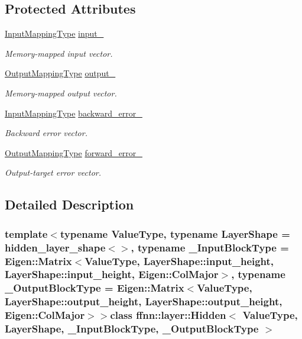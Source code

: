 \subsection*{Protected Attributes}
\begin{DoxyCompactItemize}
\item 
\hyperlink{classffnn_1_1layer_1_1_hidden_a9297d5b8ac45dc288ee1b91f15bb4047}{Input\-Mapping\-Type} \hyperlink{classffnn_1_1layer_1_1_hidden_a1177e86b75ad7ba87aa4e855defa5851}{input\-\_\-}
\begin{DoxyCompactList}\small\item\em Memory-\/mapped input vector. \end{DoxyCompactList}\item 
\hyperlink{classffnn_1_1layer_1_1_hidden_a619ae9b0890cb86b66ac2b591b5a5610}{Output\-Mapping\-Type} \hyperlink{classffnn_1_1layer_1_1_hidden_adf9818c784dccc1860fe8384264cc4be}{output\-\_\-}
\begin{DoxyCompactList}\small\item\em Memory-\/mapped output vector. \end{DoxyCompactList}\item 
\hyperlink{classffnn_1_1layer_1_1_hidden_a9297d5b8ac45dc288ee1b91f15bb4047}{Input\-Mapping\-Type} \hyperlink{classffnn_1_1layer_1_1_hidden_a94312439d5029c9c779ff778f18f95a8}{backward\-\_\-error\-\_\-}
\begin{DoxyCompactList}\small\item\em Backward error vector. \end{DoxyCompactList}\item 
\hyperlink{classffnn_1_1layer_1_1_hidden_a619ae9b0890cb86b66ac2b591b5a5610}{Output\-Mapping\-Type} \hyperlink{classffnn_1_1layer_1_1_hidden_af1f439bdd3645a5ee444455d822b5143}{forward\-\_\-error\-\_\-}
\begin{DoxyCompactList}\small\item\em Output-\/target error vector. \end{DoxyCompactList}\end{DoxyCompactItemize}


\subsection{Detailed Description}
\subsubsection*{template$<$typename Value\-Type, typename Layer\-Shape = hidden\-\_\-layer\-\_\-shape$<$$>$, typename \-\_\-\-Input\-Block\-Type = Eigen\-::\-Matrix$<$\-Value\-Type, Layer\-Shape\-::input\-\_\-height, Layer\-Shape\-::input\-\_\-height, Eigen\-::\-Col\-Major$>$, typename \-\_\-\-Output\-Block\-Type = Eigen\-::\-Matrix$<$\-Value\-Type, Layer\-Shape\-::output\-\_\-height, Layer\-Shape\-::output\-\_\-height, Eigen\-::\-Col\-Major$>$$>$class ffnn\-::layer\-::\-Hidden$<$ Value\-Type, Layer\-Shape, \-\_\-\-Input\-Block\-Type, \-\_\-\-Output\-Block\-Type $>$}

